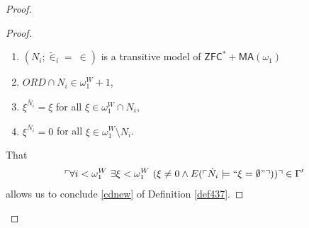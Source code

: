 \documentclass[12pt, twoside]{memoir}
\numberwithin{equation}{section}
\theoremstyle{definition}
\theoremstyle{remark}
\theoremstyle{definition}
\theoremstyle{definition}
\theoremstyle{definition}
\theoremstyle{remark}
\begin{document}
\begin{proof}
\begin{proof}
\begin{enumerate}[label=(\alph*)]
    \item $(N_i; \tilde{\in}_i = \ \in)$ is a transitive model of $\mathsf{ZFC}^* + \mathsf{MA}(\omega_1)$ 
    \item $ORD \cap N_i \in \omega_1^W + 1$,
    \item $\xi^{\bar{N}_i} = \xi$ for all $\xi \in \omega_1^W \cap N_i$,
    \item $\xi^{\bar{N}_i} = 0$ for all $\xi \in \omega_1^W \setminus N_i$.
\end{enumerate}
That 
\begin{equation*}
\ulcorner \forall i < \omega_1^W \ \exists \xi < \omega_1^W \ (\xi \neq 0 \wedge E(\ulcorner \dot{N}_i \models ``\xi = \emptyset" \urcorner)) \urcorner \in \Gamma'
\end{equation*}
allows us to conclude \ref{cdnew} of Definition \ref{def437}.


\end{proof}
\end{proof}
\end{document}
